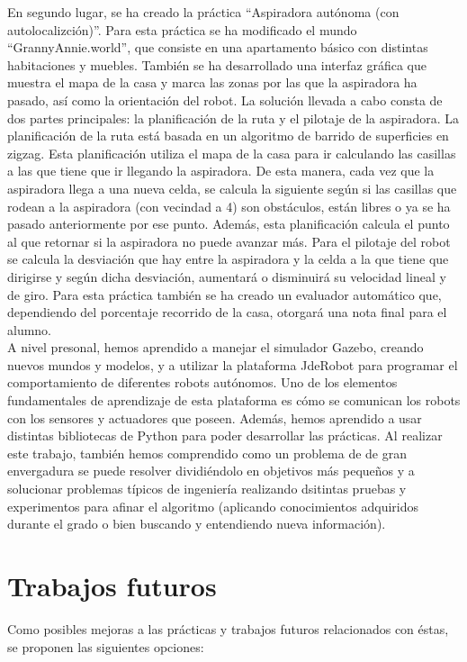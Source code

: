 En segundo lugar, se ha creado la práctica ``Aspiradora autónoma (con autolocalizción)''. Para esta práctica se ha modificado el mundo ``GrannyAnnie.world'', que consiste en una apartamento básico con distintas habitaciones y muebles. También se ha desarrollado una interfaz gráfica que muestra el mapa de la casa y marca las zonas por las que la aspiradora ha pasado, así como la orientación del robot. La solución llevada a cabo consta de dos partes principales: la planificación de la ruta y el pilotaje de la aspiradora. La planificación de la ruta está basada en un algoritmo de barrido de superficies en zigzag. Esta planificación utiliza el mapa de la casa para ir calculando las casillas a las que tiene que ir llegando la aspiradora. De esta manera, cada vez que la aspiradora llega a una nueva celda, se calcula la siguiente según si las casillas que rodean a la aspiradora (con vecindad a 4) son obstáculos, están libres o ya se ha pasado anteriormente por ese punto. Además, esta planificación calcula el punto al que retornar si la aspiradora no puede avanzar más. Para el pilotaje del robot se calcula la desviación que hay entre la aspiradora y la celda a la que tiene que dirigirse y según dicha desviación, aumentará o disminuirá su velocidad lineal y de giro. Para esta práctica también se ha creado un evaluador automático que, dependiendo del porcentaje recorrido de la casa, otorgará una nota final para el alumno.\\

A nivel presonal, hemos aprendido a manejar el simulador Gazebo, creando nuevos mundos y modelos, y a utilizar la plataforma JdeRobot para programar el comportamiento de diferentes robots autónomos. Uno de los elementos fundamentales de aprendizaje de esta plataforma es cómo se comunican los robots con los sensores y actuadores que poseen. Además, hemos aprendido a usar distintas bibliotecas de Python para poder desarrollar las prácticas. Al realizar este trabajo, también hemos comprendido como un problema de de gran envergadura se puede resolver dividiéndolo en objetivos más pequeños y a solucionar problemas típicos de ingeniería realizando dsitintas pruebas y experimentos para afinar el algoritmo (aplicando conocimientos adquiridos durante el grado o bien buscando y entendiendo nueva información).


\section{Trabajos futuros}
Como posibles mejoras a las prácticas y trabajos futuros relacionados con éstas, se proponen las siguientes opciones:

